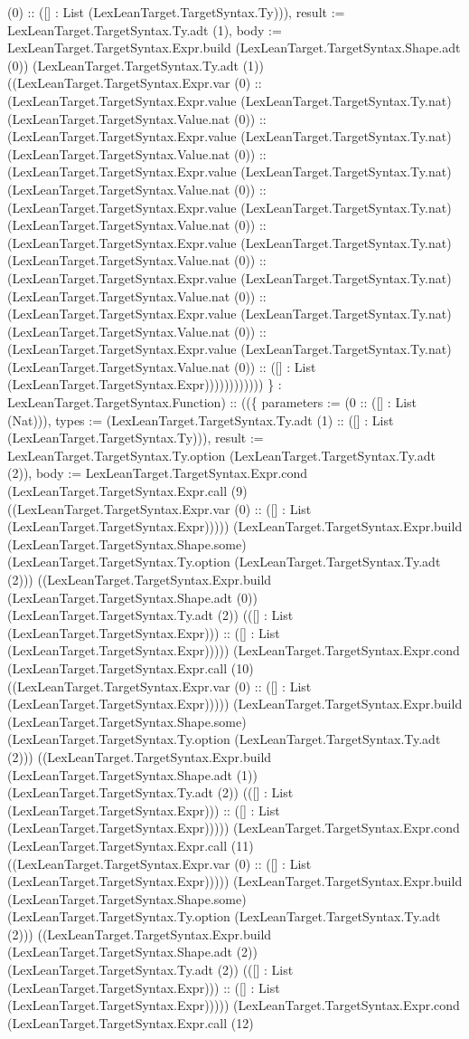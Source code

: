 \documentclass[11pt]{article}
\begin{document}
(0) :: ([] : List (LexLeanTarget.TargetSyntax.Ty))), result := LexLeanTarget.TargetSyntax.Ty.adt (1), body := LexLeanTarget.TargetSyntax.Expr.build (LexLeanTarget.TargetSyntax.Shape.adt (0)) (LexLeanTarget.TargetSyntax.Ty.adt (1)) ((LexLeanTarget.TargetSyntax.Expr.var (0) :: (LexLeanTarget.TargetSyntax.Expr.value (LexLeanTarget.TargetSyntax.Ty.nat) (LexLeanTarget.TargetSyntax.Value.nat (0)) :: (LexLeanTarget.TargetSyntax.Expr.value (LexLeanTarget.TargetSyntax.Ty.nat) (LexLeanTarget.TargetSyntax.Value.nat (0)) :: (LexLeanTarget.TargetSyntax.Expr.value (LexLeanTarget.TargetSyntax.Ty.nat) (LexLeanTarget.TargetSyntax.Value.nat (0)) :: (LexLeanTarget.TargetSyntax.Expr.value (LexLeanTarget.TargetSyntax.Ty.nat) (LexLeanTarget.TargetSyntax.Value.nat (0)) :: (LexLeanTarget.TargetSyntax.Expr.value (LexLeanTarget.TargetSyntax.Ty.nat) (LexLeanTarget.TargetSyntax.Value.nat (0)) :: (LexLeanTarget.TargetSyntax.Expr.value (LexLeanTarget.TargetSyntax.Ty.nat) (LexLeanTarget.TargetSyntax.Value.nat (0)) :: (LexLeanTarget.TargetSyntax.Expr.value (LexLeanTarget.TargetSyntax.Ty.nat) (LexLeanTarget.TargetSyntax.Value.nat (0)) :: (LexLeanTarget.TargetSyntax.Expr.value (LexLeanTarget.TargetSyntax.Ty.nat) (LexLeanTarget.TargetSyntax.Value.nat (0)) :: ([] : List (LexLeanTarget.TargetSyntax.Expr)))))))))))) \} : LexLeanTarget.TargetSyntax.Function) :: ((\{ parameters := (0 :: ([] : List (Nat))), types := (LexLeanTarget.TargetSyntax.Ty.adt (1) :: ([] : List (LexLeanTarget.TargetSyntax.Ty))), result := LexLeanTarget.TargetSyntax.Ty.option (LexLeanTarget.TargetSyntax.Ty.adt (2)), body := LexLeanTarget.TargetSyntax.Expr.cond (LexLeanTarget.TargetSyntax.Expr.call (9) ((LexLeanTarget.TargetSyntax.Expr.var (0) :: ([] : List (LexLeanTarget.TargetSyntax.Expr))))) (LexLeanTarget.TargetSyntax.Expr.build (LexLeanTarget.TargetSyntax.Shape.some) (LexLeanTarget.TargetSyntax.Ty.option (LexLeanTarget.TargetSyntax.Ty.adt (2))) ((LexLeanTarget.TargetSyntax.Expr.build (LexLeanTarget.TargetSyntax.Shape.adt (0)) (LexLeanTarget.TargetSyntax.Ty.adt (2)) (([] : List (LexLeanTarget.TargetSyntax.Expr))) :: ([] : List (LexLeanTarget.TargetSyntax.Expr))))) (LexLeanTarget.TargetSyntax.Expr.cond (LexLeanTarget.TargetSyntax.Expr.call (10) ((LexLeanTarget.TargetSyntax.Expr.var (0) :: ([] : List (LexLeanTarget.TargetSyntax.Expr))))) (LexLeanTarget.TargetSyntax.Expr.build (LexLeanTarget.TargetSyntax.Shape.some) (LexLeanTarget.TargetSyntax.Ty.option (LexLeanTarget.TargetSyntax.Ty.adt (2))) ((LexLeanTarget.TargetSyntax.Expr.build (LexLeanTarget.TargetSyntax.Shape.adt (1)) (LexLeanTarget.TargetSyntax.Ty.adt (2)) (([] : List (LexLeanTarget.TargetSyntax.Expr))) :: ([] : List (LexLeanTarget.TargetSyntax.Expr))))) (LexLeanTarget.TargetSyntax.Expr.cond (LexLeanTarget.TargetSyntax.Expr.call (11) ((LexLeanTarget.TargetSyntax.Expr.var (0) :: ([] : List (LexLeanTarget.TargetSyntax.Expr))))) (LexLeanTarget.TargetSyntax.Expr.build (LexLeanTarget.TargetSyntax.Shape.some) (LexLeanTarget.TargetSyntax.Ty.option (LexLeanTarget.TargetSyntax.Ty.adt (2))) ((LexLeanTarget.TargetSyntax.Expr.build (LexLeanTarget.TargetSyntax.Shape.adt (2)) (LexLeanTarget.TargetSyntax.Ty.adt (2)) (([] : List (LexLeanTarget.TargetSyntax.Expr))) :: ([] : List (LexLeanTarget.TargetSyntax.Expr))))) (LexLeanTarget.TargetSyntax.Expr.cond (LexLeanTarget.TargetSyntax.Expr.call (12) 
\end{document}
